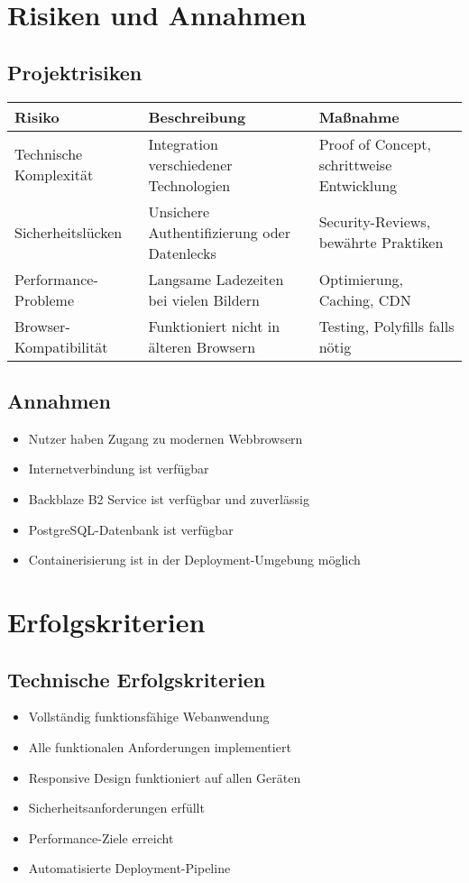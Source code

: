 \documentclass[a4paper,12pt]{article}
\begin{document}
\section{Risiken und Annahmen}

\subsection{Projektrisiken}
\begin{longtable}{|p{}|p{}|p{}|}
\hline
\textbf{Risiko} & \textbf{Beschreibung} & \textbf{Maßnahme} \\
\hline
Technische Komplexität & Integration verschiedener Technologien & Proof of Concept, schrittweise Entwicklung \\
\hline
Sicherheitslücken & Unsichere Authentifizierung oder Datenlecks & Security-Reviews, bewährte Praktiken \\
\hline
Performance-Probleme & Langsame Ladezeiten bei vielen Bildern & Optimierung, Caching, CDN \\
\hline
Browser-Kompatibilität & Funktioniert nicht in älteren Browsern & Testing, Polyfills falls nötig \\
\hline
\end{longtable}

\subsection{Annahmen}
\begin{itemize}
    \item Nutzer haben Zugang zu modernen Webbrowsern
    \item Internetverbindung ist verfügbar
    \item Backblaze B2 Service ist verfügbar und zuverlässig
    \item PostgreSQL-Datenbank ist verfügbar
    \item Containerisierung ist in der Deployment-Umgebung möglich
\end{itemize}

\section{Erfolgskriterien}

\subsection{Technische Erfolgskriterien}
\begin{itemize}
    \item Vollständig funktionsfähige Webanwendung
    \item Alle funktionalen Anforderungen implementiert
    \item Responsive Design funktioniert auf allen Geräten
    \item Sicherheitsanforderungen erfüllt
    \item Performance-Ziele erreicht
    \item Automatisierte Deployment-Pipeline
\end{itemize}
\end{document}
